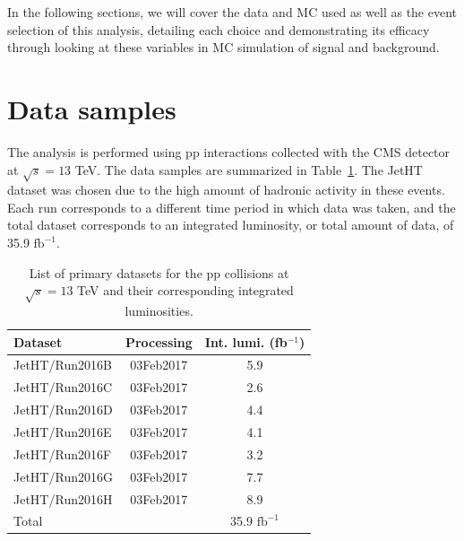In the following sections, we will cover the data and MC used as well as the event selection of this analysis, detailing each choice and demonstrating its efficacy through looking at these variables in MC simulation of signal and background.

\section{Data samples\label{ss:DataSamples}}

The analysis is performed using pp interactions collected with the CMS detector at $\sqrt{s}=13$ TeV.
The data samples are summarized in Table~\ref{tab:data}. The JetHT dataset was chosen due to the high amount of hadronic activity in these events. Each run corresponds to a different time period in which data was taken, and the total dataset corresponds to an integrated luminosity, or total amount of data, of 35.9 $\text{fb}^{-1}$.

\begin{table}[htb]
  \begin{center}
    \caption{List of primary datasets for the pp collisions at $\sqrt{s} = 13$ TeV and their corresponding integrated luminosities.} 
    \begin{tabular}{l|c|c}
      \hline
      \hline
      Dataset & Processing & Int. lumi. (fb$^{-1}$) \\
      \hline
      JetHT/Run2016B   & 03Feb2017 & 5.9  \\
      JetHT/Run2016C   & 03Feb2017 & 2.6  \\
      JetHT/Run2016D   & 03Feb2017 & 4.4  \\
      JetHT/Run2016E   & 03Feb2017 & 4.1  \\
      JetHT/Run2016F   & 03Feb2017 & 3.2  \\
      JetHT/Run2016G   & 03Feb2017 & 7.7  \\ 
      JetHT/Run2016H   & 03Feb2017 & 8.9 \\ 
      \hline
      Total & & 35.9 $\text{fb}^{-1}$ \\ 
      \hline
      \hline  
    \end{tabular}  
    \label{tab:data}
  \end{center}
\end{table}

